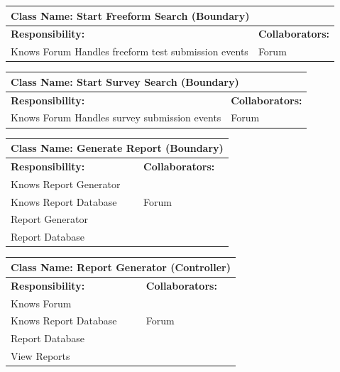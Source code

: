 \documentclass[]{article}
\begin{document}
	\begin{table}[H]
		\centering
		\begin{tabular}{|p{7cm}|p{7cm}|}
		\hline 
		 \multicolumn{2}{|l|}{\textbf{Class Name: Start Freeform Search (Boundary)}} \\
		\hline
		\textbf{Responsibility:} & \textbf{Collaborators:} \\
		\hline
		Knows Forum \newline
		Handles freeform test submission events & Forum \\
		\hline
		\end{tabular}
	\end{table}
	\begin{table}[H]
		\centering
		\begin{tabular}{|p{7cm}|p{7cm}|}
		\hline 
		 \multicolumn{2}{|l|}{\textbf{Class Name: Start Survey Search (Boundary)}} \\
		\hline
		\textbf{Responsibility:} & \textbf{Collaborators:} \\
		\hline
		Knows Forum \newline
		Handles survey submission events & Forum \\
		\hline
		\end{tabular}
	\end{table}
	\begin{table}[H]
		\centering
		\begin{tabular}{|p{7cm}|p{7cm}|}
		\hline 
		 \multicolumn{2}{|l|}{\textbf{Class Name: Generate Report (Boundary)}} \\
		\hline
		\textbf{Responsibility:} & \textbf{Collaborators:} \\
		\hline
		Knows Report Generator \\
		Knows Report Database & 		
		Forum \\
		Report Generator \\
		Report Database \\
		\hline
		\end{tabular}
	\end{table} 
	
	\begin{table}[H]
		\centering
		\begin{tabular}{|p{7cm}|p{7cm}|}
		\hline 
		 \multicolumn{2}{|l|}{\textbf{Class Name: Report Generator (Controller)}} \\
		\hline
		\textbf{Responsibility:} & \textbf{Collaborators:} \\
		\hline
		Knows Forum \\
		Knows Report Database & 		
		Forum \\
		Report Database \\
		View Reports \\
		\hline
		\end{tabular}
	\end{table} 	
	
\end{document}
